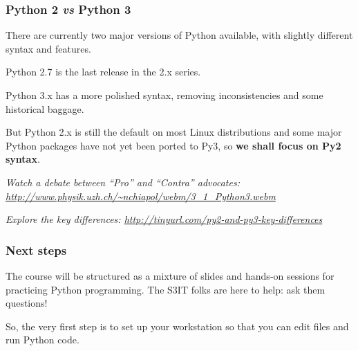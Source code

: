 \documentclass[english,serif,mathserif,xcolor=pdftex,dvipsnames,table]{beamer}
\begin{document}
\begin{frame}[fragile]
  \frametitle{Python 2 \emph{vs} Python 3}

  There are currently two major versions of Python available, with
  slightly different syntax and features.

  \+
  Python 2.7 is the last release in the 2.x series.

  \+
  Python 3.x has a more polished syntax, removing inconsistencies and
  some historical baggage.

  \+
  But Python 2.x is still the default on most Linux distributions
  and some major Python packages have not yet been ported to Py3, so
  \textbf{we shall focus on Py2 syntax}.

  \+
  {\footnotesize\em
    Watch a debate between ``Pro'' and ``Contra'' advocates:
    \url{http://www.physik.uzh.ch/~nchiapol/webm/3_1_Python3.webm}}

  \+
  {\footnotesize\em
    Explore the key differences:
    \url{http://tinyurl.com/py2-and-py3-key-differences}}
\end{frame}


\begin{frame}
  \frametitle{Next steps}

  The course will be structured as a mixture of slides and hands-on
  sessions for practicing Python programming.  The S3IT folks are here
  to help: ask them questions!

  \+
  So, the very first step is to set up your workstation so that you
  can edit files and run Python code.
\end{frame}
\end{document}
